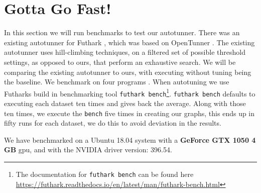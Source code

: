 \section{Gotta Go Fast!}
\label{GottaGoFast}
In this section we will run benchmarks to test our autotunner. There was an
existing autotunner for Futhark \cite{oldtune}, which was based on OpenTunner
\cite{opentunner}. The existing autotunner uses hill-climbing techniques, on a
filtered set of possible threshold settings, as opposed to ours, that perform
an exhaustive search. We will be comparing the existing autotunner to ours,
with executing without tuning being the baseline. We benchmark on four programs \cite{ppopp}. When autotuning we use Futharks build in benchmarking tool \texttt{futhark bench}\footnote{The documentation for \texttt{futhark bench} can be found here \url{https://futhark.readthedocs.io/en/latest/man/futhark-bench.html}}. \texttt{futhark bench} defaults to executing each dataset ten times and gives back the average. Along with those ten times, we execute the \texttt{bench} five times in creating our graphs, this ends up in fifty runs for each dataset, we do this to avoid deviation in the results.  

We have benchmarked on a Ubuntu 18.04 system with a \textbf{GeForce GTX 1050 4 GB} gpu, and with the NVIDIA driver version: 396.54.  

